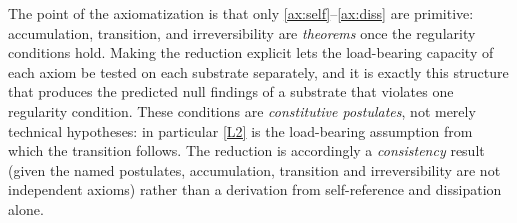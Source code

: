 \documentclass[11pt]{article}
\theoremstyle{plain}
\theoremstyle{definition}
\theoremstyle{remark}
\begin{document}
The point of the axiomatization is that only \ref{ax:self}--\ref{ax:diss} are primitive: accumulation, transition, and irreversibility are \emph{theorems} once the regularity conditions hold. Making the reduction explicit lets the load-bearing capacity of each axiom be tested on each substrate separately, and it is exactly this structure that produces the predicted null findings of a substrate that violates one regularity condition. These conditions are \emph{constitutive postulates}, not merely technical hypotheses: in particular \ref{L2} is the load-bearing assumption from which the transition follows. The reduction is accordingly a \emph{consistency} result (given the named postulates, accumulation, transition and irreversibility are not independent axioms) rather than a derivation from self-reference and dissipation alone.
\end{document}
